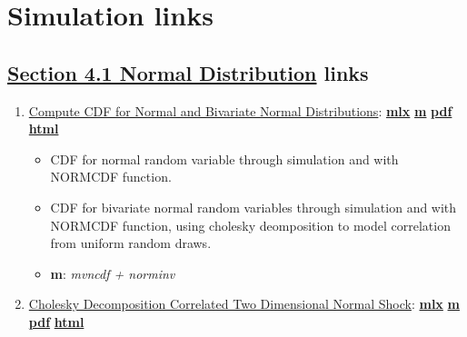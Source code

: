 \documentclass[
]{book}
\providecommand{\tightlist}{%
  \setlength{\itemsep}{0pt}\setlength{\parskip}{0pt}}
\begin{document}
\hypertarget{simulation-links}{%
\section{Simulation links}\label{simulation-links}}

\hypertarget{section-4.1-normal-distributionnormal-distribution-links}{%
\subsection{\texorpdfstring{\protect\hyperlink{normal-distribution}{Section 4.1 Normal Distribution} links}{Section 4.1 Normal Distribution links}}\label{section-4.1-normal-distributionnormal-distribution-links}}

\begin{enumerate}
\def\labelenumi{\arabic{enumi}.}
\tightlist
\item
  \href{https://fanwangecon.github.io/M4Econ/simulation/normal/htmlpdfm/fs_bivariate_normal.html}{Compute CDF for Normal and Bivariate Normal Distributions}: \href{https://github.com/FanWangEcon/M4Econ/blob/master/simulation/normal/fs_bivariate_normal.mlx}{\textbf{mlx}} \textbar{} \href{https://github.com/FanWangEcon/M4Econ/blob/master/simulation/normal/htmlpdfm/fs_bivariate_normal.m}{\textbf{m}} \textbar{} \href{https://github.com/FanWangEcon/M4Econ/blob/master/simulation/normal/htmlpdfm/fs_bivariate_normal.pdf}{\textbf{pdf}} \textbar{} \href{https://fanwangecon.github.io/M4Econ/simulation/normal/htmlpdfm/fs_bivariate_normal.html}{\textbf{html}}

  \begin{itemize}
  \tightlist
  \item
    CDF for normal random variable through simulation and with NORMCDF function.
  \item
    CDF for bivariate normal random variables through simulation and with NORMCDF function, using cholesky deomposition to model correlation from uniform random draws.
  \item
    \textbf{m}: \emph{mvncdf + norminv}
  \end{itemize}
\item
  \href{https://fanwangecon.github.io/M4Econ/simulation/normal/htmlpdfm/fs_cholesky_decomposition.html}{Cholesky Decomposition Correlated Two Dimensional Normal Shock}: \href{https://github.com/FanWangEcon/M4Econ/blob/master/simulation/normal/fs_cholesky_decomposition.mlx}{\textbf{mlx}} \textbar{} \href{https://github.com/FanWangEcon/M4Econ/blob/master/simulation/normal/htmlpdfm/fs_cholesky_decomposition.m}{\textbf{m}} \textbar{} \href{https://github.com/FanWangEcon/M4Econ/blob/master/simulation/normal/htmlpdfm/fs_cholesky_decomposition.pdf}{\textbf{pdf}} \textbar{} \href{https://fanwangecon.github.io/M4Econ/simulation/normal/htmlpdfm/fs_cholesky_decomposition.html}{\textbf{html}}


\end{enumerate}
\end{document}
